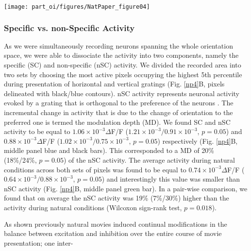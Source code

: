 \begin{SCfigure}
\texttt{[image: part\_oi/figures/NatPaper\_figure04]} 
\caption[Differences in the First-Order Characteristics of Response Levels.]
{ \protect}
\label{np4}\end{SCfigure} 


\subsubsection{Specific vs. non-Specific Activity}

As we were simultaneously recording neurons spanning the whole orientation
space, we were able to dissociate the activity into two components, namely
the specific (SC) and non-specific
(nSC) activity. We divided the
recorded area into two sets by choosing the most active pixels occupying
the highest 5th percentile during presentation of horizontal and vertical
gratings (Fig. \ref{np4}B, pixels delineated with black/blue contours). nSC
activity represents neuronal activity evoked by a grating that is
orthogonal to the preference of the neurons \citep{sharon2002a}. The
incremental change in activity that is due to the change of orientation to
the preferred one is termed the modulation depth (MD). We found SC and nSC
activity to be equal to $1.06\times 10^{-3} \Delta$F/F ($1.21\times
10^{-3}/0.91\times 10^{-3}$, $p = 0.05$) and $0.88\times 10^{-3} \Delta$F/F
($1.02\times 10^{-3}/0.75\times 10^{-3}$, $p = 0.05$) respectively (Fig.
\ref{np4}B, middle panel blue and black bars). This corresponded to a MD of
20\% (18\%/24\%, $p = 0.05$) of the nSC activity. The average activity
during natural conditions across both sets of pixels was found to be equal
to $0.74\times 10^{-3}\Delta$F/F ($0.64\times 10^{-3}/0.88\times 10^{-3}$,
$p = 0.05$) and interestingly this value was smaller than nSC activity
(Fig.  \ref{np4}B, middle panel green bar). In a pair-wise comparison, we
found that on average the nSC activity was 19\% (7\%/30\%) higher than the
activity during natural conditions (Wilcoxon sign-rank test, $p = 0.018$). 

As shown previously natural movies induced continual modifications in the
balance between excitation and inhibition over the entire course of movie
presentation; one  inter- \newpage

